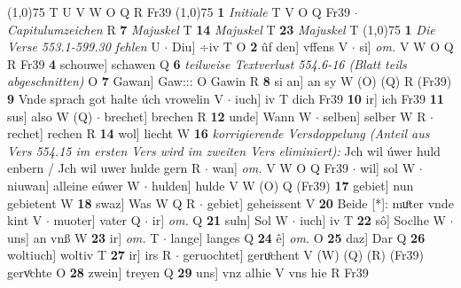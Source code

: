 \documentclass[8pt,a4paper,notitlepage]{article}
\begin{document}
\begin{table}[ht]
\begin{minipage}[t]{0.5\linewidth}
\begin{tabular}{rl}
\end{tabular}
\scriptsize
\line(1,0){75} \newline
T U V W O Q R Fr39 \newline
\line(1,0){75} \newline
\textbf{1} \textit{Initiale} T V O Q Fr39   $\cdot$ \textit{Capitulumzeichen} R  \textbf{7} \textit{Majuskel} T  \textbf{14} \textit{Majuskel} T  \textbf{23} \textit{Majuskel} T  \newline
\line(1,0){75} \newline
\textbf{1} \textit{Die Verse 553.1-599.30 fehlen} U   $\cdot$ Diu] ÷iv T O \textbf{2} ûf den] vffens V  $\cdot$ si] \textit{om.} V W O Q R Fr39 \textbf{4} schouwe] schawen Q \textbf{6} \textit{teilweise Textverlust 554.6-16 (Blatt teils abgeschnitten)} O  \textbf{7} Gawan] Gaw::: O Gawin R \textbf{8} si an] an sy W (O) (Q) R (Fr39) \textbf{9} Vnde sprach got halte úch vrowelin V  $\cdot$ iuch] iv T dich Fr39 \textbf{10} ir] ich Fr39 \textbf{11} sus] also W (Q)  $\cdot$ brechet] brechen R \textbf{12} unde] Wann W  $\cdot$ selben] selber W R  $\cdot$ rechet] rechen R \textbf{14} wol] liecht W \textbf{16} \textit{korrigierende Versdoppelung (Anteil aus Vers 554.15 im ersten Vers wird im zweiten Vers eliminiert):} Jch wil úwer huld enbern / Jch wil uwer hulde gern R   $\cdot$ wan] \textit{om.} V W O Q Fr39  $\cdot$ wil] sol W  $\cdot$ niuwan] alleine eúwer W  $\cdot$ hulden] hulde V W (O) Q (Fr39) \textbf{17} gebiet] nun gebietent W \textbf{18} swaz] Was W Q R  $\cdot$ gebiet] geheissent V \textbf{20} Beide [*]: muͦter vnde kint V  $\cdot$ muoter] vater Q  $\cdot$ ir] \textit{om.} Q \textbf{21} suln] Sol W  $\cdot$ iuch] iv T \textbf{22} sô] Soclhe W  $\cdot$ uns] an vnß W \textbf{23} ir] \textit{om.} T  $\cdot$ lange] langes Q \textbf{24} ê] \textit{om.} O \textbf{25} daz] Dar Q \textbf{26} woltiuch] woltiv T \textbf{27} ir] irs R  $\cdot$ geruochtet] geruͦchent V (W) (Q) (R) (Fr39) gervͦchte O \textbf{28} zwein] treyen Q \textbf{29} uns] vnz alhie V vns hie R Fr39 \newline
\end{minipage}
\end{table}
\end{document}
